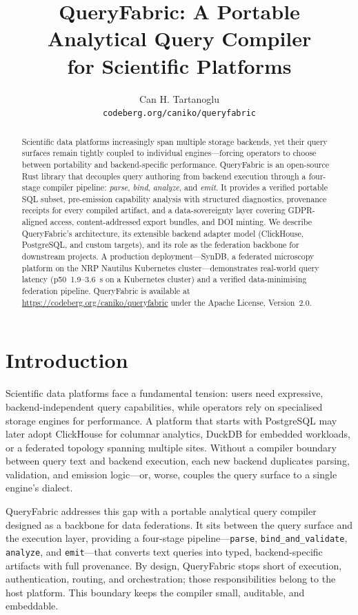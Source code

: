 \documentclass[11pt,a4paper]{article}
\title{QueryFabric: A Portable Analytical Query Compiler\\for Scientific Platforms}
\author{Can H. Tartanoglu\\\texttt{codeberg.org/caniko/queryfabric}}
\date{}
\begin{document}
\maketitle

\begin{abstract}
Scientific data platforms increasingly span multiple storage backends, yet their
query surfaces remain tightly coupled to individual engines---forcing operators
to choose between portability and backend-specific performance.
QueryFabric is an open-source Rust library that decouples query authoring from
backend execution through a four-stage compiler pipeline: \textit{parse},
\textit{bind}, \textit{analyze}, and \textit{emit}.
It provides a verified portable SQL subset, pre-emission capability analysis
with structured diagnostics, provenance receipts for every compiled artifact,
and a data-sovereignty layer covering GDPR-aligned access, content-addressed
export bundles, and DOI minting.
We describe QueryFabric's architecture, its extensible backend adapter model
(ClickHouse, PostgreSQL, and custom targets), and its role as the federation
backbone for downstream projects.
A production deployment---SynDB, a federated microscopy platform on the
NRP Nautilus Kubernetes cluster---demonstrates real-world query latency
(p50~1.9--3.6~s on a Kubernetes cluster) and a verified data-minimising
federation pipeline.
QueryFabric is available at \url{https://codeberg.org/caniko/queryfabric}
under the Apache License, Version~2.0.
\end{abstract}

\section{Introduction}
\label{sec:introduction}

Scientific data platforms face a fundamental tension: users need expressive,
backend-independent query capabilities, while operators rely on specialised
storage engines for performance.
A platform that starts with PostgreSQL may later adopt ClickHouse for
columnar analytics, DuckDB for embedded workloads, or a federated topology
spanning multiple sites.
Without a compiler boundary between query text and backend execution, each new
backend duplicates parsing, validation, and emission logic---or, worse, couples
the query surface to a single engine's dialect.

QueryFabric addresses this gap with a portable analytical query compiler
designed as a backbone for data federations.
It sits between the query surface and the execution layer, providing a
four-stage pipeline---\texttt{parse}, \texttt{bind\_and\_validate},
\texttt{analyze}, and \texttt{emit}---that converts text queries into
typed, backend-specific artifacts with full provenance.
By design, QueryFabric stops short of execution, authentication, routing,
and orchestration; those responsibilities belong to the host platform.
This boundary keeps the compiler small, auditable, and embeddable.
\end{document}
